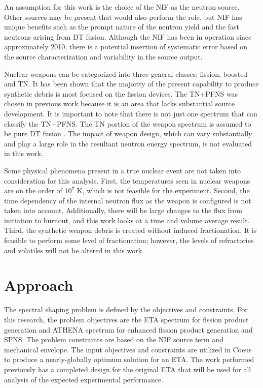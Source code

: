 An assumption for this work is the choice of the NIF as the neutron source. 
Other sources may be present that would also perform the role, but NIF has unique benefits such as the prompt nature of the neutron yield and the fast neutrons arising from DT fusion. 
Although the NIF has been in operation since approximately 2010, there is a potential insertion of systematic error based on the source characterization and variability in the source output. 

Nuclear weapons can be categorized into three general classes: fission, boosted and TN\cite{Bridgman,Mctl}. 
It has been shown that the majority of the present capability to produce synthetic debris is most focused on the fission devices\cite{Bevins}. 
The TN+PFNS was chosen in previous work because it is an area that lacks substantial source development. 
It is important to note that there is not just one spectrum that can classify the TN+PFNS. 
The TN portion of the weapon spectrum is assumed to be pure DT fusion \cite{Mctl}. 
The impact of weapon design, which can vary substantially and play a large role in the resultant neutron energy spectrum, is not evaluated in this work. 

Some physical phenomena present in a true nuclear event are not taken into consideration for this analysis. 
First, the temperatures seen in nuclear weapons are on the order of $10^{7}$ K, which is not feasible for the experiment\cite{Glasstone1977}. 
Second, the time dependency of the internal neutron flux as the weapon is configured is not taken into account. 
Additionally, there will be large changes to the flux from initiation to burnout, and this work looks at a time and volume average result. 
Third, the synthetic weapon debris is created without induced fractionation. 
It is feasible to perform some level of fractionation; however, the levels of refractories and volatiles will not be altered in this work. 

\section{Approach}

The spectral shaping problem is defined by the objectives and constraints. 
For this research, the problem objectives are the ETA spectrum for fission product generation and ATHENA spectrum for enhanced fission product generation and SPNS. 
The problem constraints are based on the NIF source term and mechanical envelope. 
The input objectives and constraints are utilized in Coeus to produce a nearly-globally optimum solution for an ETA. 
The work performed previously has a completed design for the original ETA that will be used for all analysis of the expected experimental performance. 

